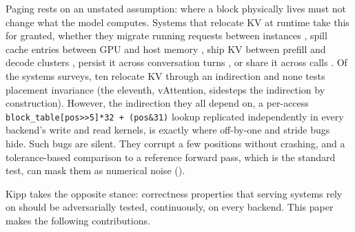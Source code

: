 \documentclass[sigconf,nonacm,screen]{acmart}
\newcommand{\code}[1]{\texttt{\small #1}}
\begin{document}
Paging rests on an unstated assumption: where a block physically lives must
not change what the model computes. Systems that relocate KV at runtime take
this for granted, whether they migrate running requests between instances
\citep{sun2024llumnix}, spill cache entries between GPU and host memory
\citep{lee2024infinigen}, ship KV between prefill and decode clusters
\citep{qin2025mooncake}, persist it across conversation turns
\citep{gao2024cachedattention}, or share it across calls
\citep{zheng2024sglang}. Of the systems  surveys, ten
relocate KV through an indirection and none tests placement invariance
(the eleventh, vAttention, sidesteps the indirection by construction). However, the indirection they all depend on, a
per-access \code{block\_table[pos>>5]*32 + (pos\&31)} lookup replicated
independently in every backend's write and read kernels, is exactly where
off-by-one and stride bugs hide. Such bugs are silent. They corrupt a few
positions without crashing, and a tolerance-based comparison to a reference
forward pass, which is the standard test, can mask them as numerical noise
().

Kipp takes the opposite stance: correctness properties that serving systems
rely on should be adversarially tested, continuously, on every backend. This
paper makes the following contributions.
\end{document}
